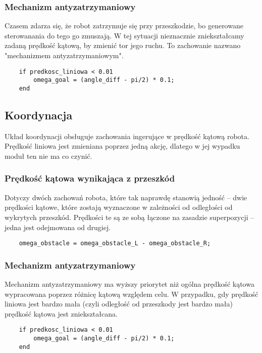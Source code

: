\documentclass[11pt]{article}
\begin{document}
\subsubsection*{Mechanizm antyzatrzymaniowy}

Czasem zdarza się, że robot zatrzymuje się przy przeszkodzie, bo generowane sterowanania do tego go zmuszają. W tej sytuacji nieznacznie zniekształcamy zadaną prędkość kątową, by zmienić tor jego ruchu. To zachowanie nazwano "mechanizmem antyzatrzymaniowym".
\begin{lstlisting}[firstnumber = 96]
    % Mechanizm antyzatrzymaniowy.
    if predkosc_liniowa < 0.01
        omega_goal = (angle_diff - pi/2) * 0.1;
    end
\end{lstlisting}

\newpage

\subsection{Koordynacja}

Układ koordynacji obsługuje zachowania ingerujące w prędkość kątową robota. Prędkość liniowa jest zmieniana poprzez jedną akcję, dlatego w jej wypadku moduł ten nie ma co czynić.

\subsubsection*{Prędkość kątowa wynikająca z przeszkód}
Dotyczy dwóch zachowań robota, które tak naprawdę stanowią jedność -- dwie prędkości kątowe, które zostają wyznaczone w zależności od odległości od wykrytych przeszkód. Prędkości te są ze sobą łączone na zasadzie superpozycji -- jedna jest odejmowana od drugiej.
\begin{lstlisting}[firstnumber = 79]
    % Koordynacja obu tych prędkości.
    omega_obstacle = omega_obstacle_L - omega_obstacle_R;
\end{lstlisting}

\subsubsection*{Mechanizm antyzatrzymaniowy}

Mechanizm antyzatrzymaniowy ma wyższy priorytet niż ogólna prędkość kątowa wypracowana poprzez różnicę kątową względem celu. W przypadku, gdy prędkość liniowa jest bardzo mała (czyli odległość od przeszkody jest bardzo mała) prędkość kątowa jest zniekształcana.
\begin{lstlisting}[firstnumber = 96]
    % Mechanizm antyzatrzymaniowy.
    if predkosc_liniowa < 0.01
        omega_goal = (angle_diff - pi/2) * 0.1;
    end
\end{lstlisting}
\end{document}
